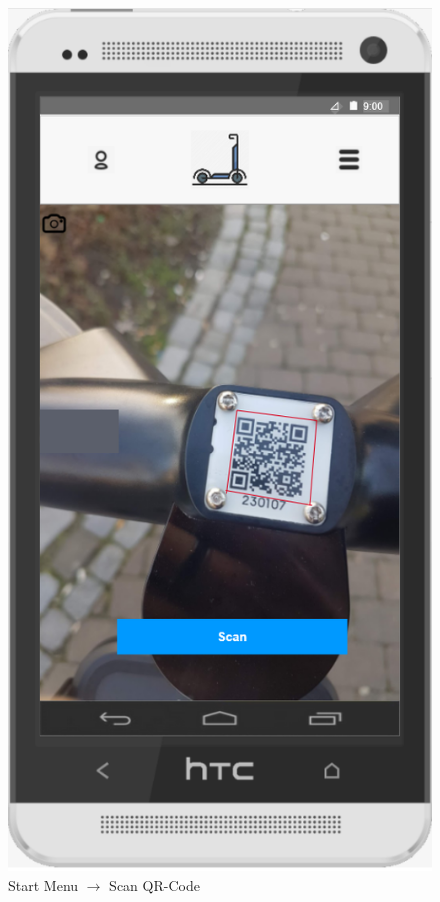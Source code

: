 \documentclass[a4paper, 12pt]{article}
\begin{document}
\begin{figure} [htbp]
  \begin{center}
    \includegraphics[scale=0.75]{images/prototypes/01-01-start-menu--scan-qr-code.png}
  \end{center}
  \caption{Start Menu $\rightarrow$ Scan QR-Code}
\end{figure}
\end{document}
